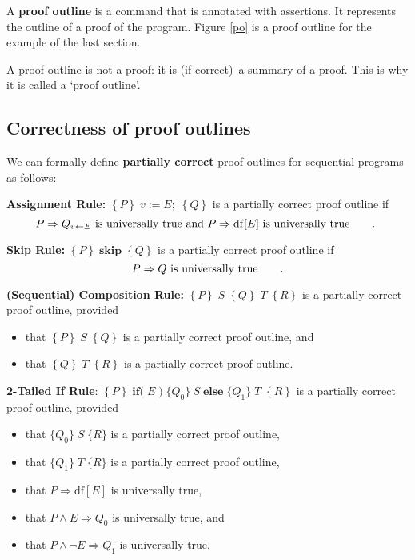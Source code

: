 \documentclass[11pt]{article}%
\begin{document}
A \textbf{proof outline} is a command that is annotated with assertions. It
represents the outline of a proof of the program. Figure \ref{po} is a proof
outline for the example of the last section.

A proof outline is not a proof: it is (if correct)\ a summary of a proof. This
is why it is called a `proof outline'.

\subsection{Correctness of proof outlines}

We can formally define \textbf{partially correct} proof outlines for
sequential programs as follows:

\textbf{Assignment Rule:} $\left\{  P\right\}  \;v:=E;\;\left\{  Q\right\}  $
is a partially correct proof outline if
\[
P\Rightarrow Q_{v\leftarrow E}\text{ is universally true and }P\Rightarrow
\mathrm{df}[E]\text{ is universally true\qquad. }%
\]


\textbf{Skip Rule:} $\left\{  P\right\}  \;\mathbf{skip}\;\left\{  Q\right\}
$ is a partially correct proof outline if%
\[
P\Rightarrow Q\text{ is universally true\qquad.}%
\]


\textbf{(Sequential) Composition Rule:} $\left\{  P\right\}  \;S\;\left\{
Q\right\}  \;T\;\left\{  R\right\}  $ is a partially correct proof outline, provided

\begin{itemize}
\item that $\left\{  P\right\}  \;S\;\left\{  Q\right\}  $ is a partially
correct proof outline, and

\item that $\left\{  Q\right\}  \;T\;\left\{  R\right\}  $ is a partially
correct proof outline.
\end{itemize}

\textbf{2-Tailed If Rule}: $\left\{  P\right\}  \;\mathbf{if(}\;E\;)\;\{Q_{0}%
\}\ S\;\mathbf{else}\;\{Q_{1}\}\;T\;\left\{  R\right\}  $ is a partially
correct proof outline, provided

\begin{itemize}
\item that $\{Q_{0}\}\;S\;\{R\}$ is a partially correct proof outline,

\item that $\{Q_{1}\}\;T\;\{R\}$ is a partially correct proof outline,

\item that $P\Rightarrow\mathrm{df}[E]$ is universally true,

\item that $P\wedge E\Rightarrow Q_{0}$ is universally true, and

\item that $P\wedge\lnot E\Rightarrow Q_{1}$ is universally true.
\end{itemize}
\end{document}

